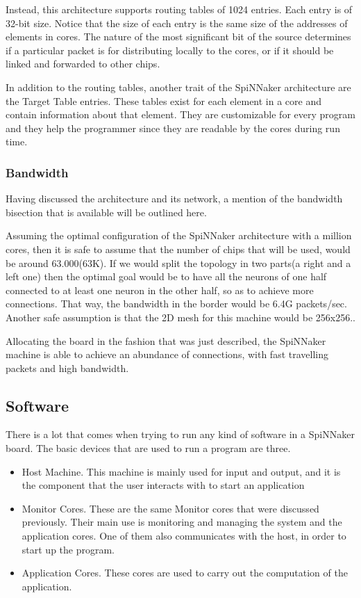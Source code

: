 \documentclass[12pt,twosided]{article}
\begin{document}
Instead, this architecture supports routing tables of 1024 entries. Each entry is of 32-bit size. Notice that the size of each entry is the same size of the addresses of elements in cores. The nature of the most significant bit of the source determines if a particular packet is for distributing locally to the cores, or if it should be linked and forwarded to other chips\cite{docfile}.

In addition to the routing tables, another trait of the SpiNNaker architecture are the Target Table entries. These tables exist for each element in a core and contain information about that element. They are customizable for every program and they help the programmer since they are readable by the cores during run time. 
\subsubsection{Bandwidth}
Having discussed the architecture and its network, a mention of the bandwidth bisection that is available will be outlined here. 

Assuming the optimal configuration of the SpiNNaker architecture with a million cores, then it is safe to assume that the number of chips that will be used, would be around 63.000(63K). If we would split the topology in two parts(a right and a left one) then the optimal goal would be to have all the neurons of one half connected to at least one neuron in the other half, so as to achieve more connections. That way, the bandwidth in the border would be 6.4G packets/sec. Another safe assumption is that the 2D mesh for this machine would be 256x256.\cite{docfile}\cite{navaridas2009understanding}.

Allocating the board in the fashion that was just described, the SpiNNaker machine is able to achieve an abundance of connections, with fast travelling packets and high bandwidth.
\subsection{Software}
There is a lot that comes when trying to run any kind of software in a SpiNNaker board. The basic devices that are used to run a program are three.
\begin{itemize}
\item Host Machine. This machine is mainly used for input and output, and it is the component that the user interacts with to start an application
\item Monitor Cores. These are the same Monitor cores that were discussed previously. Their main use is monitoring and managing the system and the application cores. One of them also communicates with the host, in order to start up the program.
\item Application Cores. These cores are used to carry out the computation of the application.\cite{furber2012overview}
\end{itemize}
\end{document}
